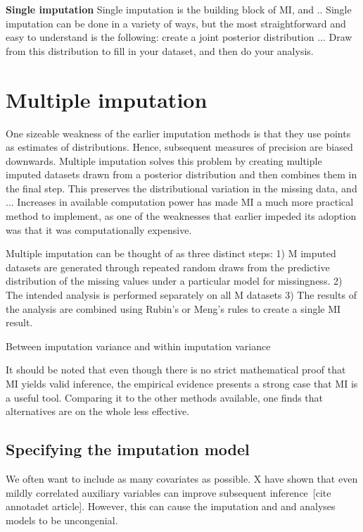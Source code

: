 \documentclass{article}
\begin{document}
	
	\textbf{Single imputation}
	Single imputation is the building block of MI, and .. Single imputation can be done in a variety of ways, but the most straightforward and easy to understand is the following: create a joint posterior distribution ... Draw from this distribution to fill in your dataset, and then do your analysis. 
	
	\section{Multiple imputation}
	One sizeable weakness of the earlier imputation methods is that they use points as estimates of distributions. Hence, subsequent measures of precision are biased downwards. Multiple imputation solves this problem by creating multiple imputed datasets drawn from a posterior distribution and then combines them in the final step. This preserves the distributional variation in the missing data, and ... Increases in available computation power has made MI a much more practical method to implement, as one of the weaknesses that earlier impeded its adoption was that it was computationally expensive. 
	
	Multiple imputation can be thought of as three distinct steps:
	1) M imputed datasets are generated through repeated random draws from the predictive distribution of the missing values under a particular model for missingness.
	2) The intended analysis is performed separately on all M datasets
	3) The results of the analysis are combined using Rubin's or Meng's rules to create a single MI result. 
	
	 
	
	Between imputation variance and within imputation variance
	
	
	It should be noted that even though there is no strict mathematical proof that MI yields valid inference, the empirical evidence presents a strong case that MI is a useful tool. Comparing it to the other methods available, one finds that alternatives are on the whole less effective.
	
	\subsection{Specifying the imputation model}
	
	
	We often want to include as many covariates as possible. X have shown that even mildly correlated auxiliary variables can improve subsequent inference [cite annotadet article]. However, this can cause the imputation and and analyses models to be uncongenial.
	
\end{document}
